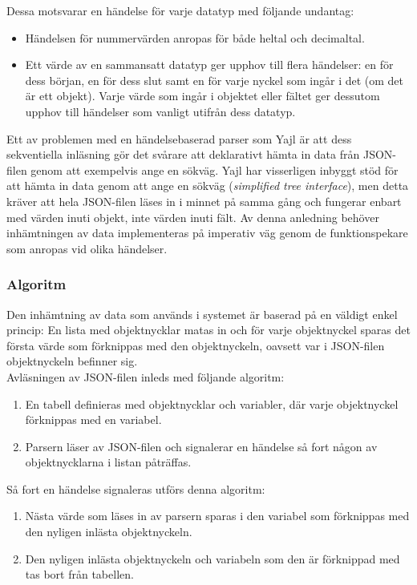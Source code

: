 \documentclass[a4paper,11pt]{article}
\begin{document}
Dessa motsvarar en händelse för varje datatyp med följande undantag:

	\begin{itemize}
	\item Händelsen för nummervärden anropas för både heltal och decimaltal.
    	\item Ett värde av en sammansatt datatyp ger upphov till flera händelser: en för dess början, en för dess slut samt en för varje nyckel som ingår i det (om det är ett objekt). Varje värde som ingår i objektet eller fältet ger dessutom upphov till händelser som vanligt utifrån dess datatyp.
    	\end{itemize}
    	
Ett av problemen med en händelsebaserad parser som Yajl är att dess sekventiella inläsning gör det svårare att deklarativt hämta in data från JSON-filen genom att exempelvis ange en sökväg. Yajl har visserligen inbyggt stöd för att hämta in data genom att ange en sökväg ({\it simplified tree interface}), men detta kräver att hela JSON-filen läses in i minnet på samma gång och fungerar enbart med värden inuti objekt, inte värden inuti fält. Av denna anledning behöver inhämtningen av data implementeras på imperativ väg genom de funktionspekare som anropas vid olika händelser.

\subsubsection{Algoritm}

Den inhämtning av data som används i systemet är baserad på en väldigt enkel princip: En lista med objektnycklar matas in och för varje objektnyckel sparas det första värde som förknippas med den objektnyckeln, oavsett var i JSON-filen objektnyckeln befinner sig.\\

Avläsningen av JSON-filen inleds med följande algoritm:

	\begin{enumerate}
    	\item En tabell definieras med objektnycklar och variabler, där varje objektnyckel förknippas med en variabel.
    	\item Parsern läser av JSON-filen och signalerar en händelse så fort någon av objektnycklarna i listan påträffas.
	\end{enumerate}

Så fort en händelse signaleras utförs denna algoritm:
	
	\begin{enumerate}
    	\item Nästa värde som läses in av parsern sparas i den variabel som förknippas med den nyligen inlästa objektnyckeln.
    	\item Den nyligen inlästa objektnyckeln och variabeln som den är förknippad med tas bort från tabellen.
	\end{enumerate}
\end{document}
